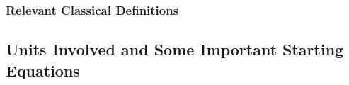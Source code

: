 \documentclass[../../Quantum-Technologies-Notes]{subfiles}
\begin{document}
%		
%		
				
				
				
			\subsubsection{Relevant Classical Definitions}
				
				
				
%			
%			
%			
%			
%	
%	
%	
%	
			
		\subsection{Units Involved and Some Important Starting Equations}
			
\end{document}
